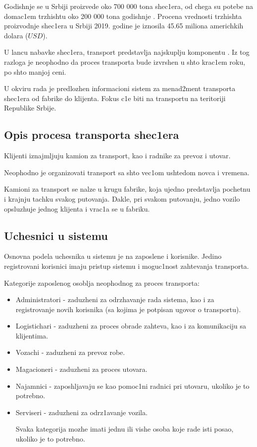 
Godishnje se u Srbiji proizvede oko 700 000 tona shec1era, od chega su potebe na domac1em trzhishtu oko 200 000 tona godishnje \cite{sugar2019}. Procena vrednosti trzhishta proizvodnje shec1era u Srbiji 2019. godine je iznosila 45.65 miliona americhkih dolara ($USD$). 

U lancu nabavke shec1era, transport predstavlja najskuplju komponentu \cite{anokic2021metaheuristic}. 
Iz tog razloga je neophodno da proces transporta bude izvrshen u shto krac1em roku, po shto manjoj ceni.

U okviru rada je predlozhen informacioni sistem za menad2ment transporta shec1era od fabrike do klijenta. Fokus c1e biti na transportu na teritoriji Republike Srbije.

\subsection{Opis procesa transporta shec1era}

Klijenti iznajmljuju kamion za transport, kao i radnike za prevoz i utovar.

Neophodno je organizovati transport sa shto vec1om ushtedom novca i vremena.

Kamioni za transport se nalze u krugu fabrike, koja ujedno predstavlja pochetnu i krajnju tachku svakog putovanja. Dakle, pri svakom putovanju, jedno vozilo opsluzhuje jednog klijenta i vrac1a se u fabriku. 


\subsection{Uchesnici u sistemu}

Osnovna podela uchesnika u sistemu je na zaposlene i korisnike. Jedino registrovani korisnici imaju pristup sistemu i moguc1nost zahtevanja transporta.

Kategorije zaposlenog osoblja neophodnog za proces transporta:
\begin{itemize}
    \item Administratori - zaduzheni za odrzhavanje rada sistema, kao i za registrovanje novih korisnika (sa kojima je potpisan ugovor o transportu).
    \item Logistichari - zaduzheni za proces obrade zahteva, kao i za komunikaciju sa klijentima.
    \item Vozachi - zaduzheni za prevoz robe.
    \item Magacioneri - zaduzheni za proces utovara.
    \item Najamnici - zaposhljavaju se kao pomoc1ni radnici pri utovaru, ukoliko je to potrebno.
    \item Serviseri - zaduzheni za odrz1avanje vozila.
    
Svaka kategorija mozhe imati jednu ili vishe osoba koje rade isti posao, ukoliko je to potrebno.

\end{itemize}

